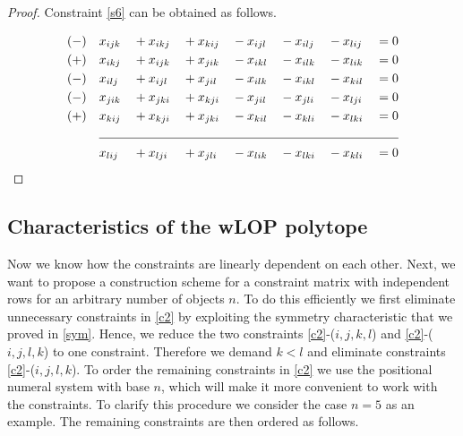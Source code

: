 \documentclass{scrartcl}
\theoremstyle{plain}
\begin{document}
\begin{proof}
	Constraint \ref{s6} can be obtained as follows.
	
	\begin{align*}
	&(-) &&x_{ijk} & &+ x_{ikj} &&+ x_{kij} &&- x_{ijl} &&- x_{ilj} &&- x_{lij} &&= 0 \\
	&(+) &&x_{ikj} & &+ x_{ijk} &&+ x_{jik} &&- x_{ikl} &&- x_{ilk} &&- x_{lik} &&= 0 \\
	&(-) &&x_{ilj} & &+ x_{ijl} &&+ x_{jil} &&- x_{ilk} &&- x_{ikl} &&- x_{kil} &&= 0 \\
	&(-) &&x_{jik} & &+ x_{jki} &&+ x_{kji} &&- x_{jil} &&- x_{jli} &&- x_{lji} &&= 0 \\
	&(+) &&x_{kij} & &+ x_{kji} &&+ x_{jki} &&- x_{kil} &&- x_{kli} &&- x_{lki} &&= 0 \\
	\cline{3-16}
	& &&x_{lij} & &+ x_{lji} &&+ x_{jli} &&- x_{lik} &&- x_{lki} &&- x_{kli} &&= 0 \\
	\end{align*}
\end{proof}
\newpage
\subsection{Characteristics of the wLOP polytope}

Now we know how the constraints are linearly dependent on each other. Next, we want to propose a construction scheme for a constraint matrix with independent rows for an arbitrary number of objects $n$. To do this efficiently we first eliminate unnecessary constraints in \eqref{c2} by exploiting the symmetry characteristic that we proved in \ref{sym}. Hence, we reduce the two constraints \eqref{c2}-($i,j,k,l$) and \eqref{c2}-($i,j,l,k$) to one constraint. Therefore we demand $k<l$ and eliminate constraints \eqref{c2}-($i,j,l,k$). To order the remaining constraints in \eqref{c2} we use the positional numeral system with base $n$, which will make it more convenient to work with the constraints. To clarify this procedure we consider the case $n=5$ as an example. The remaining constraints are then ordered as follows.
\end{document}
